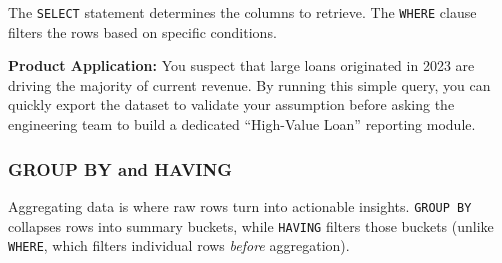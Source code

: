 The \texttt{SELECT} statement determines the columns to retrieve. The
\texttt{WHERE} clause filters the rows based on specific conditions.

\begin{Shaded}
\begin{Highlighting}[]
\OperatorTok{=}  
  \OperatorTok{\textgreater{}} 
  \OperatorTok{\textgreater{}=} \NormalTok{;}
\end{Highlighting}
\end{Shaded}

\textbf{Product Application:} You suspect that large loans originated in
2023 are driving the majority of current revenue. By running this simple
query, you can quickly export the dataset to validate your assumption
before asking the engineering team to build a dedicated ``High-Value
Loan'' reporting module.

\subsubsection{GROUP BY and HAVING}\label{group-by-and-having}

Aggregating data is where raw rows turn into actionable insights.
\texttt{GROUP\ BY} collapses rows into summary buckets, while
\texttt{HAVING} filters those buckets (unlike \texttt{WHERE}, which
filters individual rows \emph{before} aggregation).

